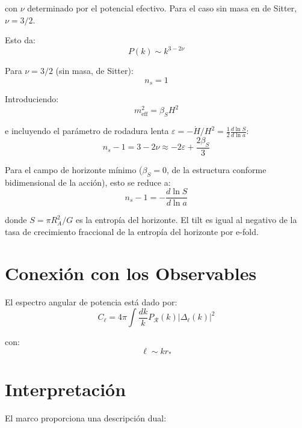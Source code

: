 \documentclass[12pt,a4paper]{article}
\begin{document}
con $\nu$ determinado por el potencial efectivo. Para el caso sin masa en de Sitter, $\nu = 3/2$.

Esto da:
\begin{equation}
P(k) \sim k^{3 - 2\nu} \tag{30}
\end{equation}

Para $\nu = 3/2$ (sin masa, de Sitter):
\begin{equation}
n_s = 1 \tag{31}
\end{equation}

Introduciendo:
\begin{equation}
m_\text{eff}^2 = \beta_S H^2 \tag{32}
\end{equation}

e incluyendo el parámetro de rodadura lenta $\varepsilon = -\dot{H}/H^2 = \frac{1}{2}\frac{d\ln S}{d\ln a}$:
\begin{equation}
n_s - 1 = 3 - 2\nu \approx -2\varepsilon + \frac{2\beta_S}{3} \tag{33}
\end{equation}

Para el campo de horizonte mínimo ($\beta_S = 0$, de la estructura conforme bidimensional de la acción), esto se reduce a:
\begin{equation}
n_s - 1 = -\frac{d\ln S}{d\ln a} \tag{33a}
\end{equation}

donde $S = \pi R_A^2/G$ es la entropía del horizonte. El tilt es igual al negativo de la tasa de crecimiento fraccional de la entropía del horizonte por e-fold.

\section{Conexión con los Observables}

El espectro angular de potencia está dado por:
\begin{equation}
C_\ell = 4\pi \int \frac{dk}{k} P_\mathcal{R}(k) |\Delta_\ell(k)|^2 \tag{34}
\end{equation}

con:
\begin{equation}
\ell \sim kr_* \tag{35}
\end{equation}

\section{Interpretación}

El marco proporciona una descripción dual:
\end{document}
